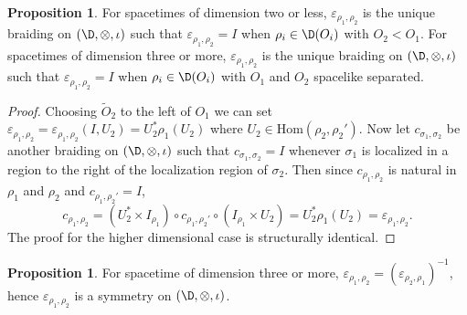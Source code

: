 \documentclass[12pt]{article}
\theoremstyle{definition}
\newtheorem{prop}[thm]{Proposition}
\theoremstyle{definition}
\theoremstyle{remark}
\newcommand{\ve}{\varepsilon}
\def\wt#1{{\tilde #1}}
\newcommand{\Hom}{\mathrm{Hom}}
\begin{document}
\begin{prop} \label{uniqsymm}
For spacetimes of dimension two or less, $\ve _{\rho _1,\rho _2}$ is the
  unique braiding on $(\D ,\otimes ,\iota )$ such that $\ve _{\rho _1,\rho _2}=I$ when
  $\rho _i\in \D (O_i)$ with $O_2<O_1$.  For spacetimes of dimension three or more,
  $\ve _{\rho _1,\rho _2}$ is the unique braiding on $(\D ,\otimes ,\iota )$ such
  that $\ve _{\rho _1,\rho _2}=I$ when $\rho _i\in \D (O_i)$ with $O_1$ and $O_2$
  spacelike separated.  \end{prop}

\begin{proof} Choosing $\wt O_2$ to the left of $O_1$ we can set $\ve _{\rho _1,\rho
    _2}=\ve _{\rho _1,\rho _2}(I,U_2)=U_2^*\rho _1(U_2)$ where $U_2\in \Hom (\rho
  _2,\rho _2')$.  Now let $c _{\sigma _1,\sigma _2}$ be another braiding on $(\D
  ,\otimes ,\iota )$ such that $c _{\sigma _1,\sigma _2}=I$ whenever $\sigma _1$ is
  localized in a region to the right of the localization region of $\sigma _2$.  Then
  since $c_{\rho _1,\rho _2}$ is natural in $\rho _1$ and $\rho _2$ and $c _{\rho
    _1,\rho _2'}=I$,
$$ c_{\rho _1,\rho _2}=  (U_2^*\times I_{\rho _1})\circ c_{\rho _1,\rho _2'}\circ
(I_{\rho _1}\times U_2) = U_2^*\rho _1(U_2)=\ve _{\rho _1,\rho _2} .$$ The proof for
the higher dimensional case is structurally identical.
\end{proof}

\begin{prop} For spacetime of dimension three or more, $\ve _{\rho _1,\rho _2}=(\ve
  _{\rho _2,\rho _1})^{-1}$, hence $\ve _{\rho _1,\rho _2}$ is a symmetry on $(\D
  ,\otimes ,\iota )$.  \end{prop}
\end{document}
